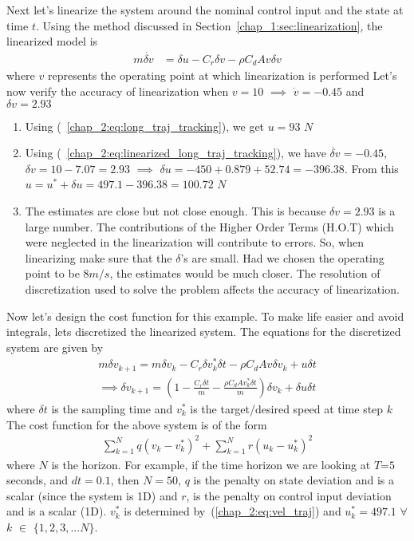 Next let's linearize the system around the nominal control input and the state at time $t$.
Using the method discussed in Section~\ref{chap_1:sec:linearization}, the linearized model is
\begin{align}
    m\dot{\delta v} &= \delta u - C_r  \delta v - \rho C_d  A  v  \delta v \label{chap_2:eq:linearized_long_traj_tracking} 
\end{align}
where $v$ represents the operating point at which linearization is performed
Let's now verify the accuracy of linearization when $v=10$ $\implies$ $\dot{v}=-0.45$ and $\delta v = 2.93$
\begin{enumerate}
    \item Using (~\ref{chap_2:eq:long_traj_tracking}), we get $u=93$ $N$ 
    \item Using (~\ref{chap_2:eq:linearized_long_traj_tracking}), we have $\dot{\delta v} = -0.45$, $\delta v = 10-7.07=2.93$ $\implies$ $\delta u = -450 + 0.879 + 52.74 = -396.38 $. From this $u = u^{*} + \delta u = 497.1 - 396.38 = 100.72$ $N$
    \item The estimates are close but not close enough. This is because $\delta v = 2.93$ is a large number. The contributions of the Higher Order Terms (H.O.T) which were neglected in the linearization will contribute to errors. So, when linearizing make sure that the $\delta$'s are small. Had we chosen the operating point to be $8 m/s$, the estimates would be much closer. The resolution of discretization used to solve the problem affects the accuracy of linearization.
\end{enumerate}

Now let's design the cost function for this example. To make life easier and avoid integrals, lets discretized the linearized system. The equations for the discretized system are given by
\begin{align}
    m\delta v_{k+1} = m\delta v_{k} - C_r \delta v^{*}_{k} \delta t - \rho C_d A v \delta v_{k} + u \delta t \\
    \implies
    \delta v_{k+1} = \left(1 - \frac{C_r \delta t}{m} - \frac{\rho C_d A v_{k}^{*} \delta t}{m}\right)\delta v_{k} + \delta u \delta t
\end{align}
where $\delta t$ is the sampling time and $v_{k}^{*}$ is the target/desired speed at time step $k$
The cost function for the above system is of the form
\begin{align*}
    \sum_{k=1}^{N}q\left(v_{k} - v^{*}_{k}\right)^2 + \sum_{k=1}^{N}r\left(u_{k} - u^{*}_{k}\right)^2
\end{align*}
where $N$ is the horizon. For example, if the time horizon we are looking at $T$=$5$ seconds, and $dt=0.1$, then $N=50$, $q$ is the penalty on state deviation and is a scalar (since the system is 1D) and $r$, is the penalty on control input deviation and is a scalar (1D).
$v_{k}^{*}$ is determined by~(\ref{chap_2:eq:vel_traj}) and $u_{k}^{*} = 497.1$ $\forall$ $k$ $\in$ $\{1, 2, 3, ... N\}$.


